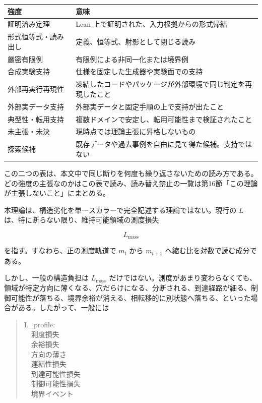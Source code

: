 \documentclass[12pt,a4paper]{article}
\begin{document}
{\def\LTcaptype{table} %
\begin{longtable}[]{@{}
  >{\raggedright\arraybackslash}p{}
  >{\raggedright\arraybackslash}p{}@{}}
\toprule\noalign{}
\begin{minipage}[b]{\linewidth}\raggedright
強度
\end{minipage} & \begin{minipage}[b]{\linewidth}\raggedright
意味
\end{minipage} \\
\midrule\noalign{}
\endhead
\bottomrule\noalign{}
\endlastfoot
証明済み定理 & Lean 上で証明された、入力根拠からの形式帰結 \\
形式恒等式・読み出し & 定義、恒等式、射影として閉じる読み \\
厳密有限例 & 有限例による非同一化または境界例 \\
合成実験支持 & 仕様を固定した生成器や実験面での支持 \\
外部再実行再現性 & 凍結したコードやパッケージが外部環境で同じ判定を再現したこと \\
外部実データ支持 & 外部実データと固定手順の上で支持が出たこと \\
典型性・転用支持 & 複数ドメインで安定し、転用可能性まで検証されたこと \\
未主張・未決 & 現時点では理論主張に昇格しないもの \\
探索候補 & 既存データや過去事例を自由に見て得た候補。支持ではない \\
\end{longtable}
}

この二つの表は、本文中で同じ断りを何度も繰り返さないための読み方である。どの強度の主張なのかはこの表で読み、読み替え禁止の一覧は第16節「この理論が主張しないこと」にまとめる。

本理論は、構造劣化を単一スカラーで完全記述する理論ではない。現行の \(L\) は、特に断らない限り、維持可能領域の測度損失

\[
L_{\mathrm{mass}}
\]

を指す。すなわち、正の測度軌道で \(m_t\) から \(m_{t+1}\) へ縮む比を対数で読む成分である。

しかし、一般の構造負担は \(L_{\mathrm{mass}}\) だけではない。測度があまり変わらなくても、領域が特定方向に薄くなる、穴だらけになる、分断される、到達経路が細る、制御可能性が落ちる、境界余裕が消える、相転移的に別状態へ落ちる、といった場合がある。したがって、一般には

\begin{quote}
{\small\ttfamily\noindent
L\_profile: \\~~測度損失 \\~~余裕損失 \\~~方向の薄さ \\~~連結性損失 \\~~到達可能性損失 \\~~制御可能性損失 \\~~境界イベント
}
\end{quote}
\end{document}
